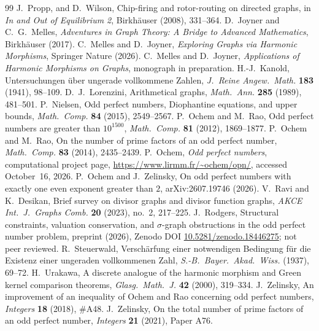 \documentclass[11pt]{article}
\theoremstyle{definition}
\theoremstyle{remark}
\begin{document}
\begin{thebibliography}{99}
  J.~Propp, and D.~Wilson, Chip-firing and rotor-routing on directed
  graphs, in \emph{In and Out of Equilibrium 2}, Birkh\"auser (2008),
  331--364.
 D.~Joyner and C.~G.~Melles, \emph{Adventures in Graph
  Theory: A Bridge to Advanced Mathematics}, Birkh\"auser (2017).
 C.~Melles and D.~Joyner, \emph{Exploring Graphs via
  Harmonic Morphisms}, Springer Nature (2026).
 C.~Melles and D.~Joyner, \emph{Applications of Harmonic
  Morphisms on Graphs}, monograph in preparation.
 H.-J.~Kanold, Untersuchungen \"uber ungerade vollkommene
  Zahlen, \emph{J.\ Reine Angew.\ Math.} \textbf{183} (1941), 98--109.
 D.~J.~Lorenzini, Arithmetical graphs, \emph{Math.\
  Ann.} \textbf{285} (1989), 481--501.
 P.~Nielsen, Odd perfect numbers, Diophantine equations,
  and upper bounds, \emph{Math.\ Comp.} \textbf{84} (2015), 2549--2567.
\bibitem{OR2012} P.~Ochem and M.~Rao, Odd perfect numbers are greater than
  $10^{1500}$, \emph{Math.\ Comp.} \textbf{81} (2012), 1869--1877.
\bibitem{OR2014} P.~Ochem and M.~Rao, On the number of prime factors of an
  odd perfect number, \emph{Math.\ Comp.} \textbf{83} (2014), 2435--2439.
\bibitem{OchemWeb} P.~Ochem, \emph{Odd perfect numbers}, computational
  project page, \url{https://www.lirmm.fr/~ochem/opn/}, accessed
  October~16, 2026.
 P.~Ochem and J.~Zelinsky, On odd perfect
  numbers with exactly one even exponent greater than $2$,
  arXiv:2607.19746 (2026).
 V.~Ravi and K.~Desikan, Brief survey on divisor
  graphs and divisor function graphs, \emph{AKCE Int.\ J.\ Graphs Comb.}
  \textbf{20} (2023), no.~2, 217--225.
 J.~Rodgers, Structural constraints, valuation
  conservation, and $\sigma$-graph obstructions in the odd perfect number
  problem, preprint (2026), Zenodo DOI
  \href{https://doi.org/10.5281/zenodo.18446275}{10.5281/zenodo.18446275};
  not peer reviewed.
 R.~Steuerwald, Versch\"arfung einer notwendigen
  Bedingung f\"ur die Existenz einer ungeraden vollkommenen Zahl,
  \emph{S.-B.\ Bayer.\ Akad.\ Wiss.} (1937), 69--72.
 H.~Urakawa, A discrete analogue of the harmonic morphism
  and Green kernel comparison theorems, \emph{Glasg.\ Math.\ J.}
  \textbf{42} (2000), 319--334.
 J.~Zelinsky, An improvement of an inequality of Ochem
  and Rao concerning odd perfect numbers, \emph{Integers} \textbf{18}
  (2018), \#A48.
 J.~Zelinsky, On the total number of prime factors
  of an odd perfect number, \emph{Integers} \textbf{21} (2021), Paper A76.
\end{thebibliography}
\end{document}
